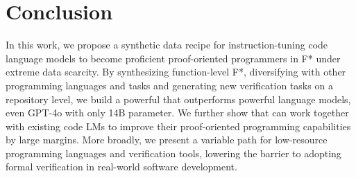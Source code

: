 \section{Conclusion}
In this work, we propose a synthetic data recipe for instruction-tuning code language models to become proficient proof-oriented programmers in F* under extreme data scarcity. By synthesizing function-level F*, diversifying with other programming languages and tasks and generating new verification tasks on a repository level, we build a powerful \name that outperforms powerful language models, even GPT-4o with only 14B parameter. We further show that \name can work together with existing code LMs to improve their proof-oriented programming capabilities by large margins.
More broadly, we present a variable path for low-resource programming languages and verification tools, lowering the barrier to adopting formal verification in real-world software development.

